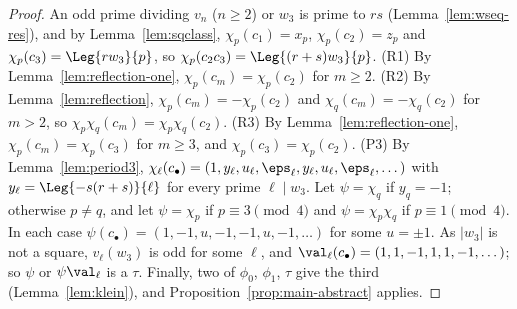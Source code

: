\begin{proof}
  \leanok
  An odd prime dividing $v_n$ ($n \ge 2$) or $w_3$ is prime to $rs$ (Lemma~\ref{lem:wseq-res}), and
  by Lemma~\ref{lem:sqclass}, $\chi_p(c_1) = x_p$, $\chi_p(c_2) = z_p$ and
  $\chi_p(c_3) = \Leg{r w_3}{p}$, so $\chi_p(c_2 c_3) = \Leg{(r+s) w_3}{p}$. (R1) By
  Lemma~\ref{lem:reflection-one}, $\chi_p(c_m) = \chi_p(c_2)$ for $m \ge 2$. (R2) By
  Lemma~\ref{lem:reflection}, $\chi_p(c_m) = -\chi_p(c_2)$ and $\chi_q(c_m) = -\chi_q(c_2)$ for
  $m > 2$, so $\chi_p\chi_q(c_m) = \chi_p\chi_q(c_2)$. (R3) By Lemma~\ref{lem:reflection-one},
  $\chi_p(c_m) = \chi_p(c_3)$ for $m \ge 3$, and $\chi_p(c_3) = \chi_p(c_2)$. (P3) By
  Lemma~\ref{lem:period3}, $\chi_\ell(c_\bullet) = (1, y_\ell, u_\ell, \eps_\ell, y_\ell, u_\ell,
  \eps_\ell, \dots)$ with $y_\ell = \Leg{-s(r+s)}{\ell}$ for every prime $\ell \mid w_3$. Let
  $\psi = \chi_q$ if $y_q = -1$; otherwise $p \ne q$, and let $\psi = \chi_p$ if
  $p \equiv 3 \pmod 4$ and $\psi = \chi_p \chi_q$ if $p \equiv 1 \pmod 4$. In each case
  $\psi(c_\bullet) = (1, -1, u, -1, -1, u, -1, \dots)$ for some $u = \pm 1$. As $|w_3|$ is not a
  square, $v_\ell(w_3)$ is odd for some $\ell$, and $\val_\ell(c_\bullet) =
  (1, 1, -1, 1, 1, -1, \dots)$; so $\psi$ or $\psi \val_\ell$ is a $\tau$. Finally, two of
  $\phi_0$, $\phi_1$, $\tau$ give the third (Lemma~\ref{lem:klein}), and
  Proposition~\ref{prop:main-abstract} applies.
\end{proof}

